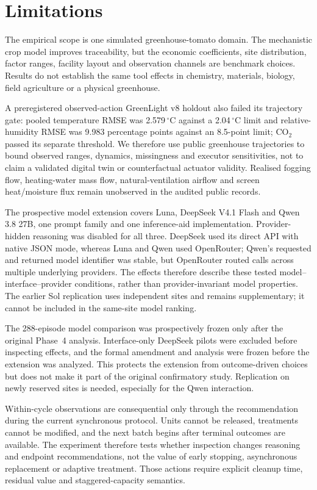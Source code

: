 \section{Limitations}
\label{sec:limitations}

The empirical scope is one simulated greenhouse-tomato domain. The mechanistic crop model
improves traceability, but the economic coefficients, site distribution, factor ranges,
facility layout and observation channels are benchmark choices. Results do not establish
the same tool effects in chemistry, materials, biology, field agriculture or a physical
greenhouse.

A preregistered observed-action GreenLight v8 holdout also failed its trajectory gate:
pooled temperature RMSE was 2.579\,$^\circ$C against a 2.04\,$^\circ$C limit and
relative-humidity RMSE was 9.983 percentage points against an 8.5-point limit; CO$_2$
passed its separate threshold. We therefore use public greenhouse trajectories to bound
observed ranges, dynamics, missingness and executor sensitivities, not to claim a validated
digital twin or counterfactual actuator validity. Realised fogging flow, heating-water
mass flow, natural-ventilation airflow and screen heat/moisture flux remain unobserved in
the audited public records.

The prospective model extension covers Luna, DeepSeek V4.1 Flash and Qwen 3.8 27B, one
prompt family and one inference-aid implementation. Provider-hidden reasoning was disabled
for all three. DeepSeek used its direct API with native JSON mode, whereas Luna and Qwen
used OpenRouter; Qwen's requested and returned model identifier was stable, but OpenRouter
routed calls across multiple underlying providers. The effects therefore describe these
tested model--interface--provider conditions, rather than provider-invariant model
properties. The earlier Sol replication uses independent sites and remains supplementary;
it cannot be included in the same-site model ranking.

The 288-episode model comparison was prospectively frozen only after the original Phase~4
analysis. Interface-only DeepSeek pilots were excluded before inspecting effects, and the
formal amendment and analysis were frozen before the extension was analyzed. This protects
the extension from outcome-driven choices but does not make it part of the original
confirmatory study. Replication on newly reserved sites is needed, especially for the Qwen
interaction.

Within-cycle observations are consequential only through the recommendation during the
current synchronous protocol. Units cannot be released, treatments cannot be modified, and
the next batch begins after terminal outcomes are available. The experiment therefore tests
whether inspection changes reasoning and endpoint recommendations, not the value of early
stopping, asynchronous replacement or adaptive treatment. Those actions require explicit
cleanup time, residual value and staggered-capacity semantics.

